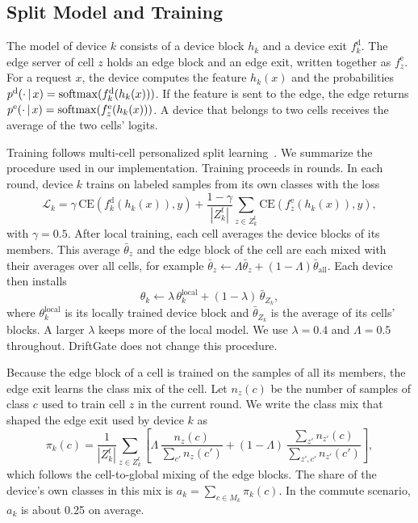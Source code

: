 \subsection{Split Model and Training}
\label{sec:training}

The model of device $k$ consists of a device block $h_k$ and a device exit $f_k^{\mathrm{d}}$. The edge server of cell $z$ holds an edge block and an edge exit, written together as $f_z^{\mathrm{e}}$. For a request $x$, the device computes the feature $h_k(x)$ and the probabilities $p^{\mathrm{d}}(\cdot\,|\,x)=\mathrm{softmax}(f_k^{\mathrm{d}}(h_k(x)))$. If the feature is sent to the edge, the edge returns $p^{\mathrm{e}}(\cdot\,|\,x)=\mathrm{softmax}(f_z^{\mathrm{e}}(h_k(x)))$. A device that belongs to two cells receives the average of the two cells' logits.

Training follows multi-cell personalized split learning~\cite{han2023splitgp,rizwan2026splitomc}. We summarize the procedure used in our implementation. Training proceeds in rounds. In each round, device $k$ trains on labeled samples from its own classes with the loss
\begin{equation}
\mathcal{L}_k=\gamma\,\mathrm{CE}\!\left(f_k^{\mathrm{d}}(h_k(x)),y\right)+\frac{1-\gamma}{|Z_k^t|}\sum_{z\in Z_k^t}\mathrm{CE}\!\left(f_z^{\mathrm{e}}(h_k(x)),y\right),
\label{eq:loss}
\end{equation}
with $\gamma=0.5$. After local training, each cell averages the device blocks of its members. This average $\bar\theta_z$ and the edge block of the cell are each mixed with their averages over all cells, for example $\bar\theta_z\leftarrow\Lambda\bar\theta_z+(1-\Lambda)\bar\theta_{\mathrm{all}}$. Each device then installs
\begin{equation}
\theta_k\leftarrow\lambda\,\theta_k^{\mathrm{local}}+(1-\lambda)\,\bar\theta_{Z_k},
\label{eq:lambda}
\end{equation}
where $\theta_k^{\mathrm{local}}$ is its locally trained device block and $\bar\theta_{Z_k}$ is the average of its cells' blocks. A larger $\lambda$ keeps more of the local model. We use $\lambda=0.4$ and $\Lambda=0.5$ throughout. DriftGate does not change this procedure.

Because the edge block of a cell is trained on the samples of all its members, the edge exit learns the class mix of the cell. Let $n_z(c)$ be the number of samples of class $c$ used to train cell $z$ in the current round. We write the class mix that shaped the edge exit used by device $k$ as
\begin{equation}
\pi_k(c)=\frac{1}{|Z_k^t|}\sum_{z\in Z_k^t}\left[\Lambda\,\frac{n_z(c)}{\sum_{c'}n_z(c')}+(1-\Lambda)\,\frac{\sum_{z'}n_{z'}(c)}{\sum_{z',c'}n_{z'}(c')}\right],
\label{eq:pi}
\end{equation}
which follows the cell-to-global mixing of the edge blocks. The share of the device's own classes in this mix is $a_k=\sum_{c\in M_k}\pi_k(c)$. In the commute scenario, $a_k$ is about 0.25 on average.

